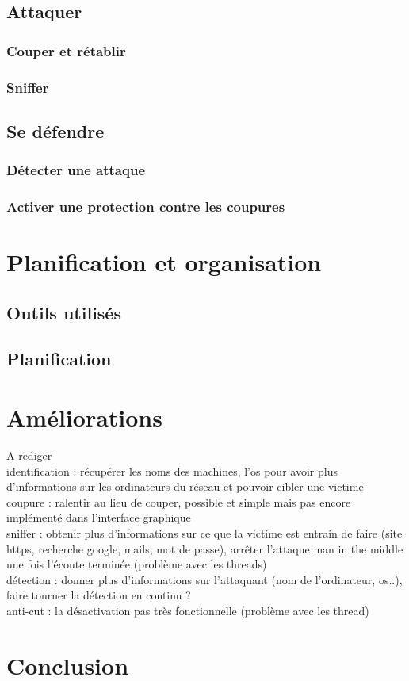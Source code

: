 \documentclass[11pt]{article}
\begin{document}
\subsection{Attaquer}
\subsubsection{Couper et rétablir}
\subsubsection{Sniffer}
\subsection{Se défendre}
\subsubsection{Détecter une attaque}
\subsubsection{Activer une protection contre les coupures}

\section{Planification et organisation}
\subsection{Outils utilisés}
\subsection{Planification}

\section{Améliorations}
A rediger\\
identification : récupérer les noms des machines, l'os pour avoir plus d'informations sur les ordinateurs du réseau et pouvoir cibler une victime\\
coupure : ralentir au lieu de couper, possible et simple mais pas encore implémenté dans l'interface graphique\\
sniffer : obtenir plus d'informations sur ce que la victime est entrain de faire (site https, recherche google, mails, mot de passe), arrêter l'attaque man in the middle une fois l'écoute terminée (problème avec les threads)\\
détection : donner plus d'informations sur l'attaquant (nom de l'ordinateur, os..), faire tourner la détection en continu ? \\
anti-cut : la désactivation pas très fonctionnelle (problème avec les thread)\\
\section*{Conclusion}

\newpage
\listoffigures
\lstlistoflistings
\end{document}
